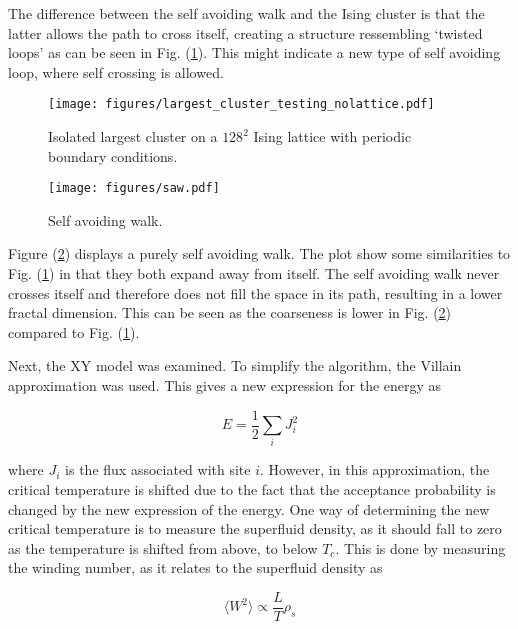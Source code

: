 \noindent The difference between the self avoiding walk and the Ising cluster is that the latter allows the path to cross itself, creating a structure ressembling `twisted loops' as can be seen in Fig. (\ref{fig:largest_cluster_illu}). This might indicate a new type of self avoiding loop, where self crossing is allowed.

\begin{figure}[h!]
    \centering
        \texttt{[image: figures/largest\_cluster\_testing\_nolattice.pdf]}
    \caption{Isolated largest cluster on a $128^2$ Ising lattice with periodic boundary conditions.}
    \label{fig:largest_cluster_illu}
\end{figure}

\begin{figure}[h!]
    \centering
        \texttt{[image: figures/saw.pdf]}
    \caption{Self avoiding walk.}
    \label{fig:result_saw}
\end{figure}

Figure (\ref{fig:result_saw}) displays a purely self avoiding walk. The plot show some similarities to Fig. (\ref{fig:largest_cluster_illu}) in that they both expand away from itself. The self avoiding walk never crosses itself and therefore does not fill the space in its path, resulting in a lower fractal dimension. This can be seen as the coarseness is lower in Fig. (\ref{fig:result_saw}) compared to Fig. (\ref{fig:largest_cluster_illu}).

\newpage

Next, the XY model was examined. To simplify the algorithm, the Villain approximation \cite{Villain:VillainOriginalPaper} was used. This gives a new expression for the energy as

\begin{equation}
    E = \frac{1}{2} \sum_i J^2_i
\label{eq:results_villain_energy}
\end{equation}

\noindent where $J_i$ is the flux associated with site $i$. However, in this approximation, the critical temperature is shifted due to the fact that the acceptance probability is changed by the new expression of the energy. One way of determining the new critical temperature is to measure the superfluid density, as it should fall to zero as the temperature is shifted from above, to below $T_c$. This is done by measuring the winding number, as it relates to the superfluid density as

\begin{equation}
    \langle W^2 \rangle \propto \frac{L}{T} \rho_s
\end{equation}

